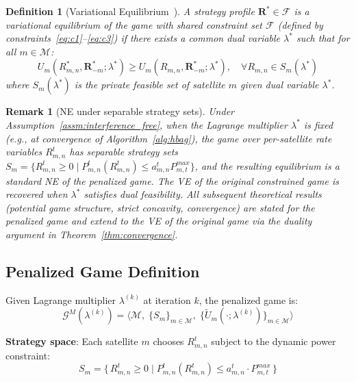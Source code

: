 \documentclass[journal]{IEEEtran}
\newtheorem{definition}{Definition}
\newtheorem{remark}{Remark}
\newcommand{\calM}{\mathcal{M}}
\newcommand{\calG}{\mathcal{G}}
\newcommand{\bfR}{\mathbf{R}}
\newcommand{\Rmn}{R_{m,n}^{t}}
\begin{document}
\begin{definition}[Variational Equilibrium~\cite{facchinei2007vi}]
\label{def:ve}
A strategy profile $\bfR^* \in \mathcal{F}$ is a
\emph{variational equilibrium} of the game with
shared constraint set $\mathcal{F}$ (defined by constraints~\eqref{eq:c1}--\eqref{eq:c3}) if there exists a common dual variable $\lambda^*$ such that for all $m\in\calM$:
\begin{equation}
    U_m(R_{m,n}^{*},\bfR_{-m}^*;\lambda^*)
    \geq U_m(R_{m,n},\bfR_{-m}^*;\lambda^*),
    \quad \forall R_{m,n}\in S_m(\lambda^*)
    \label{eq:ve_def}
\end{equation}
where $S_m(\lambda^*)$ is the private feasible set of satellite $m$ given dual variable $\lambda^*$.
\end{definition}

\begin{remark}[NE under separable strategy sets]
\label{rem:ne_ve}
Under Assumption~\ref{assm:interference_free}, when the Lagrange multiplier $\lambda^*$ is fixed (e.g., at convergence of Algorithm~\ref{alg:hbag}), the game over per-satellite rate variables $\Rmn$ has \emph{separable} strategy sets $S_m = \{R_{m,n}^t \geq 0 \mid P_{m,n}^t(R_{m,n}^t) \leq a_{m,n}^t P_{m,t}^{max}\}$, and the resulting equilibrium is a standard NE of the
\emph{penalized} game.
The VE of the original constrained game is recovered when $\lambda^*$ satisfies dual feasibility. All subsequent theoretical results (potential game structure, strict concavity, convergence) are stated for the penalized game and extend to the VE of the original game via the duality argument in Theorem~\ref{thm:convergence}.
\end{remark}

\subsection{Penalized Game Definition}

Given Lagrange multiplier $\lambda^{(k)}$ at iteration $k$, the penalized game is:
\begin{equation}
    \calG^M(\lambda^{(k)}) = \bigl\langle \calM,\;
    \{S_m\}_{m\in\calM},\;
    \{\tilde{U}_m(\cdot;\lambda^{(k)})\}_{m\in\calM}
    \bigr\rangle
\end{equation}

\textbf{Strategy space}: Each satellite $m$ chooses
$R_{m,n}^t$ subject to the dynamic power constraint:
\begin{equation}
    S_m = \bigl\{\, R_{m,n}^t \geq 0 \;\big|\;
    P_{m,n}^t(R_{m,n}^t) \leq
    a_{m,n}^t \cdot P_{m,t}^{max} \,\bigr\}
    \label{eq:strategy_space}
\end{equation}
\end{document}

